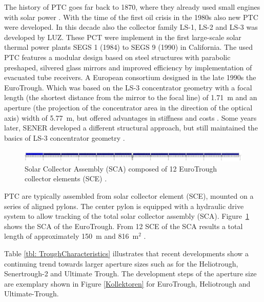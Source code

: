 The history of PTC goes far back to 1870, where they already used small engines with solar power \cite{Fernandez-Garcia2010}. With the time of the first oil crisis in the 1980s also new PTC were developed. In this decade also the collector family LS-1, LS-2 and LS-3 was developed by LUZ. These PCT  were implement in the first large-scale solar thermal power plants SEGS 1 (1984) to SEGS 9 (1990) in California. The used PTC features a modular design based on steel structures with parabolic preshaped, silvered glass mirrors and improved efficiency by implementation of evacuated tube receivers. A European consortium designed in the late 1990s the EuroTrough. Which was based on the LS-3 concentrator geometry with a focal length (the shortest distance from the mirror to the focal line) of 1.71~m and an aperture (the projection of the concentrator area in the direction of the optical axis) width of 5.77~m, but offered advantages in stiffness and costs \cite{Osuna2001}. Some years later, SENER developed a different structural approach, but still maintained the basics of LS-3 concentrator geometry \cite{Fernandez-Garcia2010}.
\begin{figure}[!h] 
\centering
\includegraphics[width=1\linewidth]{FIG/SCA_EuroTrough}
\caption[Solar Collector Assembly (SCA) composed of 12 EuroTrough collector elements (SCE).]{Solar Collector Assembly (SCA) composed of 12 EuroTrough collector elements (SCE) \cite{VonReeken2014}.}\label{SCA_EuroTrough}
\end{figure}


PTC are typically assembled from solar collector element (SCE), mounted on a series of aligned pylons. The center pylon is equipped with a hydraulic drive system to allow tracking of the total solar collector assembly (SCA). Figure~\ref{SCA_EuroTrough} shows the SCA of the EuroTrough. From 12 SCE of the SCA results a total length of approximately 150~m and 816~m$^2$ \cite{VonReeken2014}. 

Table \ref{tbl: TroughCharacteristics} illustrates that recent developments show a continuing trend towards larger aperture sizes such as for the Heliotrough, Senertrough-2 and Ultimate Trough. The development steps of the aperture size are exemplary shown in Figure \ref{Kollektoren} for EuroTrough, Heliotrough and Ultimate-Trough. 

